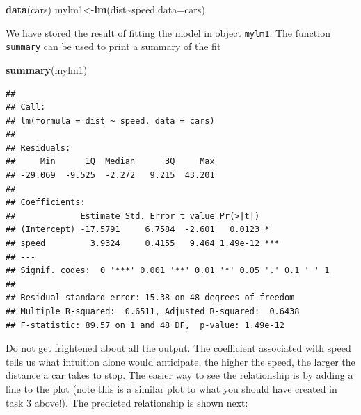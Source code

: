 \documentclass[
]{article}
\newenvironment{Shaded}{\begin{snugshade}}{\end{snugshade}}
\newcommand{\AttributeTok}[1]{\textcolor[rgb]{0.13,0.29,0.53}{#1}}
\newcommand{\DecValTok}[1]{\textcolor[rgb]{0.00,0.00,0.81}{#1}}
\newcommand{\FunctionTok}[1]{\textcolor[rgb]{0.13,0.29,0.53}{\textbf{#1}}}
\newcommand{\NormalTok}[1]{#1}
\newcommand{\OtherTok}[1]{\textcolor[rgb]{0.56,0.35,0.01}{#1}}
\newcommand{\SpecialCharTok}[1]{\textcolor[rgb]{0.81,0.36,0.00}{\textbf{#1}}}
\newcommand{\StringTok}[1]{\textcolor[rgb]{0.31,0.60,0.02}{#1}}
\begin{document}
\begin{Shaded}
\begin{Highlighting}[]
\FunctionTok{data}\NormalTok{(cars)}
\NormalTok{mylm1}\OtherTok{\textless{}{-}}\FunctionTok{lm}\NormalTok{(dist}\SpecialCharTok{\textasciitilde{}}\NormalTok{speed,}\AttributeTok{data=}\NormalTok{cars)}
\end{Highlighting}
\end{Shaded}

We have stored the result of fitting the model in object \texttt{mylm1}.
The function \texttt{summary} can be used to print a summary of the fit

\begin{Shaded}
\begin{Highlighting}[]
\FunctionTok{summary}\NormalTok{(mylm1)}
\end{Highlighting}
\end{Shaded}

\begin{verbatim}
## 
## Call:
## lm(formula = dist ~ speed, data = cars)
## 
## Residuals:
##     Min      1Q  Median      3Q     Max 
## -29.069  -9.525  -2.272   9.215  43.201 
## 
## Coefficients:
##             Estimate Std. Error t value Pr(>|t|)    
## (Intercept) -17.5791     6.7584  -2.601   0.0123 *  
## speed         3.9324     0.4155   9.464 1.49e-12 ***
## ---
## Signif. codes:  0 '***' 0.001 '**' 0.01 '*' 0.05 '.' 0.1 ' ' 1
## 
## Residual standard error: 15.38 on 48 degrees of freedom
## Multiple R-squared:  0.6511, Adjusted R-squared:  0.6438 
## F-statistic: 89.57 on 1 and 48 DF,  p-value: 1.49e-12
\end{verbatim}

Do not get frightened about all the output. The coefficient associated
with speed tells us what intuition alone would anticipate, the higher
the speed, the larger the distance a car takes to stop. The easier way
to see the relationship is by adding a line to the plot (note this is a
similar plot to what you should have created in task 3 above!). The
predicted relationship is shown next:

\begin{Shaded}
\end{Shaded}
\end{document}
